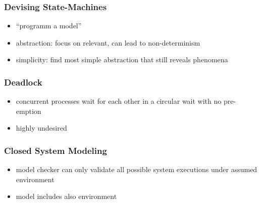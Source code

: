 \documentclass[a4paper, 10pt]{article}
\begin{document}
\subsubsection*{Devising State-Machines}
\begin{itemize}
    \item ``programm a model''
    \item abstraction: focus on relevant, can lead to non-determinism
    \item simplicity: find most simple abstraction that still reveals phenomena
\end{itemize}

\subsubsection*{Deadlock}
\begin{itemize}
    \item concurrent processes wait for each other in a circular wait with no pre-emption
    \item highly undesired
\end{itemize}

\subsubsection*{Closed System Modeling}
\begin{itemize}
    \item model checker can only validate all possible system executions under assumed environment
    \item model includes also environment
\end{itemize}
\end{document}
